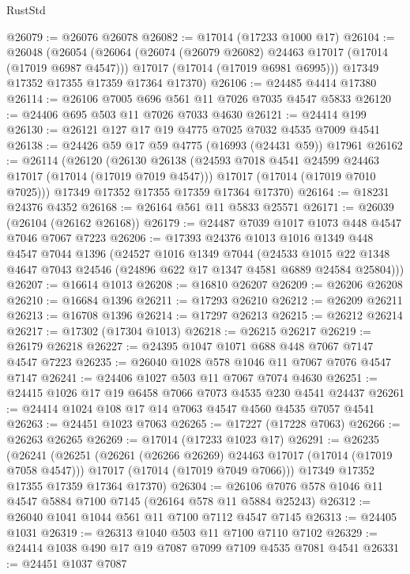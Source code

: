 \begin{lexlean}{RustStd}
\begin{coremodule}
{\begin{coremodule}
{{{{{{{{{{{{{{{{{{{{{{{{{{{{{{{{{{{{{{{{{{{{{{{{{{{{{{{@26079 := @26076 @26078
@26082 := @17014 (@17233 @1000 @17)
@26104 := @26048
    (@26054
      (@26064
        (@26074 (@26079 @26082) @24463 @17017 (@17014 (@17019 @6987 @4547)))
        @17017
        (@17014 (@17019 @6981 @6995)))
      @17349
      @17352
      @17355
      @17359
      @17364
      @17370)
@26106 := @24485 @4414 @17380
@26114 := @26106 @7005 @696 @561 @11 @7026 @7035 @4547 @5833
@26120 := @24406 @695 @503 @11 @7026 @7033 @4630
@26121 := @24414 @199
@26130 := @26121 @127 @17 @19 @4775 @7025 @7032 @4535 @7009 @4541
@26138 := @24426 @59 @17 @59 @4775 (@16993 (@24431 @59)) @17961
@26162 := @26114
    (@26120
      (@26130
        @26138
        (@24593 @7018 @4541 @24599 @24463 @17017 (@17014 (@17019 @7019 @4547)))
        @17017
        (@17014 (@17019 @7010 @7025)))
      @17349
      @17352
      @17355
      @17359
      @17364
      @17370)
@26164 := @18231 @24376 @4352
@26168 := @26164 @561 @11 @5833 @25571
@26171 := @26039 (@26104 (@26162 @26168))
@26179 := @24487 @7039 @1017 @1073 @448 @4547 @7046 @7067 @7223
@26206 := @17393
    @24376
    @1013
    @1016
    @1349
    @448
    @4547
    @7044
    @1396
    (@24527
      @1016
      @1349
      @7044
      (@24533 @1015 @22 @1348 @4647 @7043 @24546 (@24896 @622 @17 @1347 @4581 @6889 @24584 @25804)))
@26207 := @16614 @1013
@26208 := @16810 @26207
@26209 := @26206 @26208
@26210 := @16684 @1396
@26211 := @17293 @26210
@26212 := @26209 @26211
@26213 := @16708 @1396
@26214 := @17297 @26213
@26215 := @26212 @26214
@26217 := @17302 (@17304 @1013)
@26218 := @26215 @26217
@26219 := @26179 @26218
@26227 := @24395 @1047 @1071 @688 @448 @7067 @7147 @4547 @7223
@26235 := @26040 @1028 @578 @1046 @11 @7067 @7076 @4547 @7147
@26241 := @24406 @1027 @503 @11 @7067 @7074 @4630
@26251 := @24415 @1026 @17 @19 @6458 @7066 @7073 @4535 @230 @4541 @24437
@26261 := @24414 @1024 @108 @17 @14 @7063 @4547 @4560 @4535 @7057 @4541
@26263 := @24451 @1023 @7063
@26265 := @17227 (@17228 @7063)
@26266 := @26263 @26265
@26269 := @17014 (@17233 @1023 @17)
@26291 := @26235
    (@26241
      (@26251
        (@26261 (@26266 @26269) @24463 @17017 (@17014 (@17019 @7058 @4547)))
        @17017
        (@17014 (@17019 @7049 @7066)))
      @17349
      @17352
      @17355
      @17359
      @17364
      @17370)
@26304 := @26106 @7076 @578 @1046 @11 @4547 @5884 @7100 @7145 (@26164 @578 @11 @5884 @25243)
@26312 := @26040 @1041 @1044 @561 @11 @7100 @7112 @4547 @7145
@26313 := @24405 @1031
@26319 := @26313 @1040 @503 @11 @7100 @7110 @7102
@26329 := @24414 @1038 @490 @17 @19 @7087 @7099 @7109 @4535 @7081 @4541
@26331 := @24451 @1037 @7087
}}}}}}}}}}}}}}}}}}}}}}}}}}}}}}}}}}}}}}}}}}}}}}}}}}}}}}}
\end{coremodule}}
\end{coremodule}
\end{lexlean}
